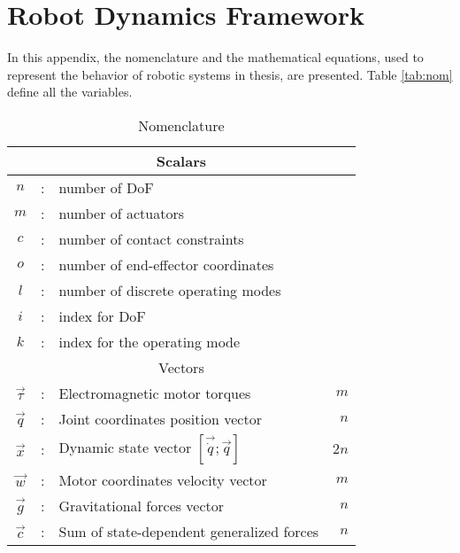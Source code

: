 \chapter{Robot Dynamics Framework}
\label{sec:robotdynamic}

In this appendix, the nomenclature and the mathematical equations, used to represent the behavior of robotic systems in thesis, are presented. Table \ref{tab:nom} define all the variables.

\begin{table}[htbp]
	\centering
	\caption{Nomenclature}	%
		\begin{tabular}{ c c l r }
        \hline \hline
				\multicolumn{4}{c}{Scalars} \\
				\hline \hline
			$n$             &  :  & number of DoF                                              & \\
			$m$             &  :  & number of actuators                                        & \\
			$c$             &  :  & number of contact constraints                              & \\
			$o$             &  :  & number of end-effector coordinates                         & \\ 
			$l$             &  :  & number of discrete operating modes                         & \\ 
			$i$             &  :  & index for DoF                                              & \\
			$k$             &  :  & index for the operating mode                               & \\ 
			\hline \hline
			\multicolumn{4}{c}{Vectors} \\
			\hline \hline
			$\vec{\tau}$    &  :  & Electromagnetic motor torques                              & $m$  \\
			$\vec{q}$       &  :  & Joint coordinates position vector                          & $n$  \\
			$\vec{x}$       &  :  & Dynamic state vector $[\vec{\dot{q}} ;\vec{q}]$            & $2n$  \\
			$\vec{w}$       &  :  & Motor coordinates velocity vector                          & $m$  \\ 
			$\vec{g}$       &  :  & Gravitational forces vector                                & $n$  \\
			$\vec{c}$       &  :  & Sum of state-dependent generalized forces                  & $n$  \\

\end{tabular}
\end{table}
